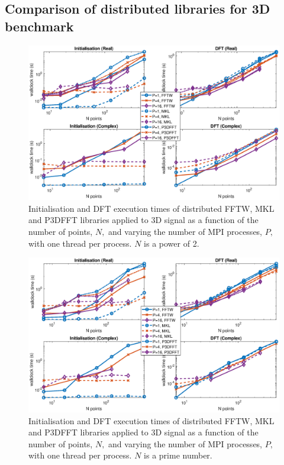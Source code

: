 \documentclass[a4paper]{article}
\begin{document}
\subsection{Comparison of distributed libraries for 3D benchmark}\label{Sec:3DDistComp}


\begin{figure}[htb]
    \centering
    \includegraphics[width=0.9\linewidth]{../results/fftw_mkl_p3dfft_2_3d_mpi.eps}
  \caption{Initialisation and DFT execution times of distributed FFTW, MKL and P3DFFT libraries applied to 3D signal as a function of the
    number of points, $N,$ and varying the number of MPI processes, $P,$ with one thread per process. $N$ is a power of 2.}
  \label{3DDistFFTWMKLP3DFFT2}
\end{figure}


\begin{figure}[htb]
    \centering
    \includegraphics[width=0.9\linewidth]{../results/fftw_mkl_p3dfft_prime_3d_mpi.eps}
  \caption{Initialisation and DFT execution times of distributed FFTW, MKL and P3DFFT libraries applied to 3D signal as a function of the
    number of points, $N,$ and varying the number of MPI processes, $P,$ with one thread per process. $N$ is a prime number.}
  \label{3DDistFFTWMKLP3DFFTprime}
\end{figure}
\end{document}
